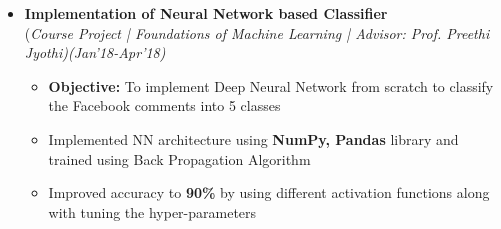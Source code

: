 \documentclass[a4paper,10pt]{article}
\begin{document}
\begin{itemize}
\item \textbf{Implementation of Neural Network based Classifier} \\ 
(\emph{Course Project | Foundations of Machine Learning | Advisor: Prof. Preethi Jyothi)\hfill (Jan'18-Apr’18)} \\[-0.4cm]
	\begin{itemize}[noitemsep,nolistsep]
	\item \textbf{Objective:} To implement Deep Neural Network from scratch to classify the Facebook comments into 5 classes %
    \item Implemented NN architecture using \textbf{NumPy, Pandas} library and trained using Back Propagation Algorithm
    \item Improved accuracy to \textbf{90\%} by using different activation functions along with tuning the hyper-parameters
	\end{itemize}




\end{itemize}
\end{document}
